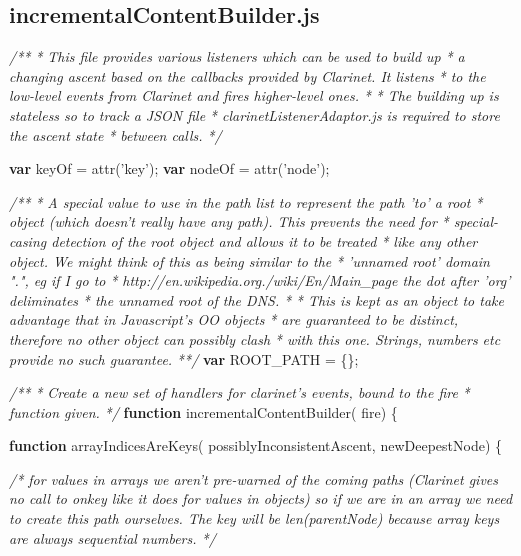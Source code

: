 \documentclass[]{article}
\newenvironment{Shaded}{}{}
\newcommand{\KeywordTok}[1]{\textcolor[rgb]{0.00,0.44,0.13}{\textbf{{#1}}}}
\newcommand{\StringTok}[1]{\textcolor[rgb]{0.25,0.44,0.63}{{#1}}}
\newcommand{\CommentTok}[1]{\textcolor[rgb]{0.38,0.63,0.69}{\textit{{#1}}}}
\newcommand{\FunctionTok}[1]{\textcolor[rgb]{0.02,0.16,0.49}{{#1}}}
\newcommand{\NormalTok}[1]{{#1}}
\begin{document}
\pagebreak

\subsection{incrementalContentBuilder.js}

\begin{Shaded}
\begin{Highlighting}[]
\CommentTok{/** }
\CommentTok{ * This file provides various listeners which can be used to build up}
\CommentTok{ * a changing ascent based on the callbacks provided by Clarinet. It listens}
\CommentTok{ * to the low-level events from Clarinet and fires higher-level ones.}
\CommentTok{ *  }
\CommentTok{ * The building up is stateless so to track a JSON file}
\CommentTok{ * clarinetListenerAdaptor.js is required to store the ascent state}
\CommentTok{ * between calls.}
\CommentTok{ */}


\KeywordTok{var} \NormalTok{keyOf = }\FunctionTok{attr}\NormalTok{(}\StringTok{'key'}\NormalTok{);}
\KeywordTok{var} \NormalTok{nodeOf = }\FunctionTok{attr}\NormalTok{(}\StringTok{'node'}\NormalTok{);}


\CommentTok{/** }
\CommentTok{ * A special value to use in the path list to represent the path 'to' a root }
\CommentTok{ * object (which doesn't really have any path). This prevents the need for }
\CommentTok{ * special-casing detection of the root object and allows it to be treated }
\CommentTok{ * like any other object. We might think of this as being similar to the }
\CommentTok{ * 'unnamed root' domain ".", eg if I go to }
\CommentTok{ * http://en.wikipedia.org./wiki/En/Main_page the dot after 'org' deliminates }
\CommentTok{ * the unnamed root of the DNS.}
\CommentTok{ * }
\CommentTok{ * This is kept as an object to take advantage that in Javascript's OO objects }
\CommentTok{ * are guaranteed to be distinct, therefore no other object can possibly clash }
\CommentTok{ * with this one. Strings, numbers etc provide no such guarantee. }
\CommentTok{ **/}
\KeywordTok{var} \NormalTok{ROOT_PATH = \{\};}


\CommentTok{/**}
\CommentTok{ * Create a new set of handlers for clarinet's events, bound to the fire }
\CommentTok{ * function given.  }
\CommentTok{ */} 
\KeywordTok{function} \FunctionTok{incrementalContentBuilder}\NormalTok{( fire) \{}


   \KeywordTok{function} \FunctionTok{arrayIndicesAreKeys}\NormalTok{( possiblyInconsistentAscent, newDeepestNode) \{}
   
      \CommentTok{/* for values in arrays we aren't pre-warned of the coming paths }
\CommentTok{         (Clarinet gives no call to onkey like it does for values in objects) }
\CommentTok{         so if we are in an array we need to create this path ourselves. The }
\CommentTok{         key will be len(parentNode) because array keys are always sequential }
\CommentTok{         numbers. */}


\end{Highlighting}
\end{Shaded}
\end{document}
